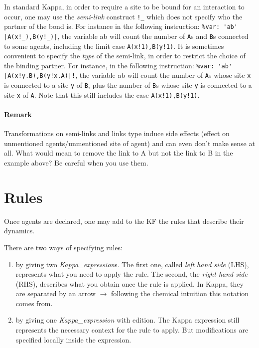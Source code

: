 \documentclass[11pt]{book}
\def\ttt#1{\texttt{#1}}
\def\var#1{{\textquotesingle}#1{\textquotesingle}}
\def\rar{\rightarrow}
\newcommand{\Remark}{\paragraph{Remark}}
\begin{document}
In standard Kappa, in order to require a site to be bound for an
interaction to occur, one may use the
\emph{semi-link} construct \ttt{!\_} which does not
specify who the partner of the bond is. For instance in the following instruction:
\lstinline[language=kappa]*%var: 'ab' |A(x!_),B(y!_)|*,
the variable \var{ab} will count the number of \ttt{A}s and \ttt{B}s connected to some agents,
including the limit case \ttt{A(x!1),B(y!1)}. It is sometimes
convenient to specify the \emph{type} of the
semi-link, in order to restrict the choice of the binding partner. For
instance, in the following instruction:
\lstinline[language=kappa]*%var: 'ab' |A(x!y.B),B(y!x.A)|!*,
the variable \var{ab}
will count the number of \ttt{A}s whose
site \ttt{x} is connected to a site \ttt{y} of \ttt{B}, plus the
number of \ttt{B}s whose site \ttt{y} is connected to a site \ttt{x}
of \ttt{A}. Note that this still includes the case
\ttt{A(x!1),B(y!1)}.

\Remark{Transformations on semi-links and links type induce side
  effects (effect on unmentioned agents/unmentioned site of agent) and
  can even don't make sense at all. What would mean to remove the link
  to A but not the link to B in the example above? Be careful when
  you use them.}

\section{Rules}\label{sec:rules}

Once agents are declared, one may add to the KF the
rules that describe their dynamics.

There are two ways of specifying rules:
\begin{enumerate}
  \item by giving two {\it Kappa\_expression}s. The first one, called
    \emph{left hand side} (LHS), represents what
    you need to apply the rule. The second, the \emph{right hand
      side} (RHS), describes what you obtain
    once the rule is applied. In Kappa, they are separated by an arrow $\rar$ following the chemical intuition this notation comes from.
  \item by giving one {\it Kappa\_expression} with edition. The Kappa
    expression still represents the necessary context for the rule to
    apply. But modifications are specified locally inside the expression.
\end{enumerate}
\end{document}
